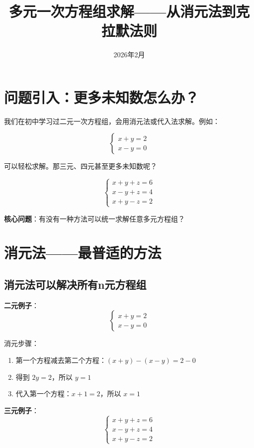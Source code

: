 \documentclass[12pt,a4paper]{article}
\title{多元一次方程组求解——从消元法到克拉默法则}
\date{2026年2月}
\begin{document}
\maketitle

\tableofcontents

\section{问题引入：更多未知数怎么办？}

我们在初中学习过二元一次方程组，会用消元法或代入法求解。例如：

\[
\begin{cases}
x + y = 2 \\
x - y = 0
\end{cases}
\]

可以轻松求解。那三元、四元甚至更多未知数呢？

\[
\begin{cases}
x + y + z = 6 \\
x - y + z = 4 \\
x + y - z = 2
\end{cases}
\]

\textbf{核心问题}：有没有一种方法可以统一求解任意多元方程组？

\section{消元法——最普适的方法}

\subsection{消元法可以解决所有n元方程组}

\textbf{二元例子}：
\[
\begin{cases} x + y = 2 \\ x - y = 0 \end{cases}
\]

消元步骤：
\begin{enumerate}
    \item 第一个方程减去第二个方程：$(x+y) - (x-y) = 2-0$
    \item 得到 $2y = 2$，所以 $y = 1$
    \item 代入第一个方程：$x + 1 = 2$，所以 $x = 1$
\end{enumerate}

\textbf{三元例子}：
\[
\begin{cases}
x + y + z = 6 \\
x - y + z = 4 \\
x + y - z = 2
\end{cases}
\]
\end{document}

